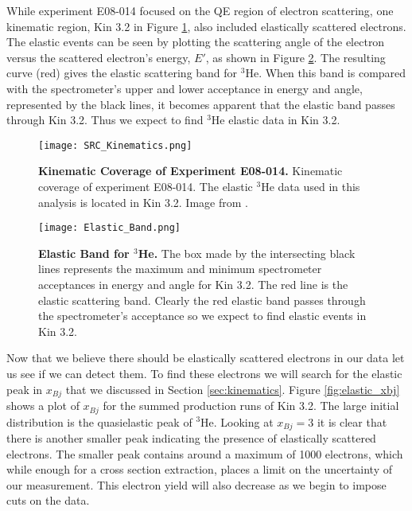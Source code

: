 While experiment E08-014 focused on the QE region of electron scattering, one kinematic region, Kin 3.2 in Figure \ref{fig:kin3.2}, also included elastically scattered electrons. The elastic events can be seen by plotting the scattering angle of the electron versus the scattered electron's energy, $E'$, as shown in Figure \ref{fig:elastic_band}. The resulting curve (red) gives the elastic scattering band for $^3$He. When this band is compared with the spectrometer's upper and lower acceptance in energy and angle, represented by the black lines, it becomes apparent that the elastic band passes through Kin 3.2. Thus we expect to find $^3$He elastic data in Kin 3.2. 

\begin{figure}[!ht]
\begin{center}
\texttt{[image: SRC\_Kinematics.png]}
\end{center}
\caption[Kinematic Coverage of Experiment E08-014]{
{\bf{Kinematic Coverage of Experiment E08-014.}} Kinematic coverage of experiment E08-014. The elastic $^3$He data used in this analysis is located in Kin 3.2. Image from \cite{Thesis:Ye}.}
\label{fig:kin3.2}
\end{figure}

\begin{figure}[!ht]
\begin{center}
\texttt{[image: Elastic\_Band.png]}
\end{center}
\caption[Elastic Band for $^3$He]{
{\bf{Elastic Band for $^3$He.}} The box made by the intersecting black lines represents the maximum and minimum spectrometer acceptances in energy and angle for Kin 3.2. The red line is the elastic scattering band. Clearly the red elastic band passes through the spectrometer's acceptance so we expect to find elastic events in Kin 3.2.}
\label{fig:elastic_band}
\end{figure}

Now that we believe there should be elastically scattered electrons in our data let us see if we can detect them. To find these electrons we will search for the elastic peak in $x_{Bj}$ that we discussed in Section \ref{sec:kinematics}. Figure \ref{fig:elastic_xbj} shows a plot of $x_{Bj}$ for the summed production runs of Kin 3.2. The large initial distribution is the quasielastic peak of $^3$He. Looking at $x_{Bj}=3$ it is clear that there is another smaller peak indicating the presence of elastically scattered electrons. The smaller peak contains around a maximum of 1000 electrons, which while enough for a cross section extraction, places a limit on the uncertainty of our measurement. This electron yield will also decrease as we begin to impose cuts on the data.

